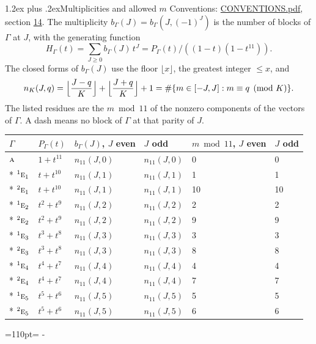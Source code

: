 \documentclass[10pt,a4paper]{article}
\makeatletter
\renewcommand\section{\@startsection{section}{1}{\z@}{-3ex plus -1ex minus -.2ex}%
  {1.2ex plus .2ex}{\normalfont\large\sffamily\bfseries\color{parttitle}}}
\newcommand{\needspace}[1]{\par\penalty-100\begingroup\dimen0=#1\relax\dimen2=\pagegoal
  \advance\dimen2-\pagetotal\ifdim\dimen0>\dimen2\relax\ifdim\dimen2>0pt\vfil\break\fi\fi
  \endgroup}
\numberwithin{equation}{section}
\newcommand{\irr}[1]{\text{\normalfont\scshape #1}}
\newcommand{\conjpair}[1]{{}^{#1}}
\makeatother
\begin{document}
\section{Multiplicities and allowed \texorpdfstring{$m$}{m}}\label{s:multiplicities}
Conventions: \href{../../CONVENTIONS.pdf}{CONVENTIONS.pdf}, section \href{../../CONVENTIONS.pdf\#conv.14}{14}.
\leavevmode\label{n:function.generating}\label{n:index.generating.variable}\label{n:function.generating.numerator}The multiplicity $b_\Gamma(J) = b_\Gamma(J, (-1)^J)$ is the number of blocks of $\Gamma$ at $J$, with the generating function
\begin{equation}\label{e:gf}H_\Gamma(t) = \sum_{J\ge0} b_\Gamma(J)\,t^J = P_\Gamma(t)/((1-t)(1-t^{11})).\end{equation}
\leavevmode\label{n:delimiter.floor}\label{n:local.floor.x}\label{n:function.count}\label{n:index.modulus.K}\label{n:index.residue}The closed forms of $b_\Gamma(J)$ use the floor $\lfloor x\rfloor$, the greatest integer $\le x$, and
\begin{equation}\label{e:count}n_K(J,q) = \Bigl\lfloor\frac{J-q}{K}\Bigr\rfloor + \Bigl\lfloor\frac{J+q}{K}\Bigr\rfloor + 1 = \#\{m\in[-J,J] : m\equiv q \pmod{K}\}.\end{equation}
\leavevmode\label{n:head.parity}The listed residues are the $m \bmod 11$ of the nonzero components of the vectors of $\Gamma$. A dash means no block of $\Gamma$ at that parity of $J$.
{\small\begin{longtable}{@{}llllll@{}}\toprule
$\Gamma$ & $P_\Gamma(t)$ & $b_\Gamma(J)$, $J$ even & $J$ odd & $m \bmod 11$, $J$ even & $J$ odd\\\midrule\endhead
\bottomrule\endfoot\endlastfoot
$\irr{a}$ & $1 + t^{11}$ & $n_{11}(J,0)$ & $n_{11}(J,0)$ & 0 & 0\\*
$\conjpair{1}\irr{e}_{1}$ & $t + t^{10}$ & $n_{11}(J,1)$ & $n_{11}(J,1)$ & 1 & 1\\*
$\conjpair{2}\irr{e}_{1}$ & $t + t^{10}$ & $n_{11}(J,1)$ & $n_{11}(J,1)$ & 10 & 10\\*
$\conjpair{1}\irr{e}_{2}$ & $t^{2} + t^{9}$ & $n_{11}(J,2)$ & $n_{11}(J,2)$ & 2 & 2\\*
$\conjpair{2}\irr{e}_{2}$ & $t^{2} + t^{9}$ & $n_{11}(J,2)$ & $n_{11}(J,2)$ & 9 & 9\\*
$\conjpair{1}\irr{e}_{3}$ & $t^{3} + t^{8}$ & $n_{11}(J,3)$ & $n_{11}(J,3)$ & 3 & 3\\*
$\conjpair{2}\irr{e}_{3}$ & $t^{3} + t^{8}$ & $n_{11}(J,3)$ & $n_{11}(J,3)$ & 8 & 8\\*
$\conjpair{1}\irr{e}_{4}$ & $t^{4} + t^{7}$ & $n_{11}(J,4)$ & $n_{11}(J,4)$ & 4 & 4\\*
$\conjpair{2}\irr{e}_{4}$ & $t^{4} + t^{7}$ & $n_{11}(J,4)$ & $n_{11}(J,4)$ & 7 & 7\\*
$\conjpair{1}\irr{e}_{5}$ & $t^{5} + t^{6}$ & $n_{11}(J,5)$ & $n_{11}(J,5)$ & 5 & 5\\*
$\conjpair{2}\irr{e}_{5}$ & $t^{5} + t^{6}$ & $n_{11}(J,5)$ & $n_{11}(J,5)$ & 6 & 6\\
\bottomrule\end{longtable}}
\needspace{110pt}
\end{document}
